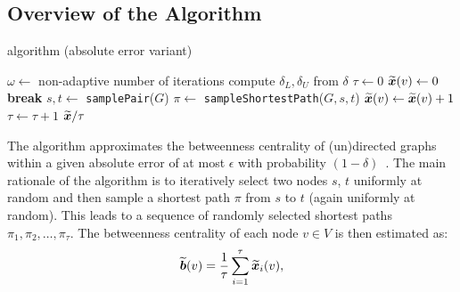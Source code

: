 \documentclass[algorithms,article,submit,moreauthors,pdftex]{Definitions/mdpi}
\begin{document}
\subsection{Overview of the \kad Algorithm}
\label{sub:kadabra}
%
\begin{algorithm}[bt]
\caption{\kad algorithm (absolute error variant)}
\label{algo:kadabra}
\setlength\baselineskip{16pt}
\begin{algorithmic}[1]
	\State $\omega \gets$ non-adaptive number of iterations
	\State compute $\delta_L, \delta_U$ from $\delta$ \label{line:delta_guess}
	\State $\tau \gets 0$ 
		\State ${\widetilde{\bm{x}}}(v) \gets 0$ 
	\EndFor
	\While{$\tau < \omega$}
				\label{line:adaptive}
			\State \textbf{break} 
		\EndIf
		  \label{line:param}
			\State $s, t \gets$ \texttt{samplePair}($G$)
			\State $\pi \gets$ \texttt{sampleShortestPath}($G, s, t$)
				\State ${\widetilde{\bm{x}}}(v) \gets {\ensuremath{\widetilde{\bm{x}}}}(v) + 1$
			\EndFor
			\State $\tau \gets \tau + 1$
		\EndFor
	\EndWhile
	\State \Return ${\widetilde{\bm{x}}} / \tau$
\EndProcedure
\end{algorithmic}
\end{algorithm}
%
The \kad algorithm approximates the betweenness centrality of
(un)directed graphs within a given absolute error of at most
$\epsilon$ with probability
$(1 - \delta)$~\cite{borassi2016kadabra}.
%
The main rationale of the algorithm is to iteratively select two nodes $s$, $t$ uniformly at
random and then sample a shortest path $\pi$
from $s$ to $t$ (again uniformly at random).
This leads to a sequence of randomly selected shortest paths
$\pi_1, \pi_2, \dots, \pi_\tau$.
The betweenness centrality of each node $v \in V$ is then estimated as:
\begin{equation}
\label{eq:betweenness_estimation}
  {\ensuremath{\widetilde{\bm{b}}}}(v) = \frac{1}{\tau}\sum_{i = 1}^{\tau}{{\widetilde{\bm{x}}}_i(v)},
\end{equation}
\end{document}
